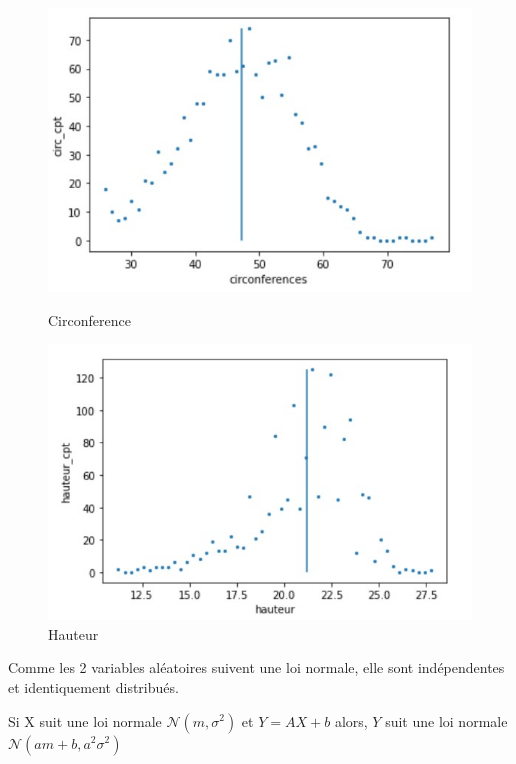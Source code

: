 \documentclass[pdflatex]{article}
\theoremstyle{definition}
\begin{document}
\begin{figure}
    \centering
    \begin{minipage}{0.45\textwidth}
        \centering
            \includegraphics[scale=0.5]{circ_normale.jpg}
            \caption{Circonference}
            \label{fig:Circonference}
    \end{minipage}\hfill
    \begin{minipage}{0.45\textwidth}
        \centering
        \includegraphics[scale=0.5]{hauteur_normale.jpg}
        \caption{Hauteur}
        \label{fig:Hauteur}
    \end{minipage}
\end{figure}


Comme les 2 variables al\'eatoires suivent une loi normale, elle sont ind\'ependentes et identiquement distribu\'es.

Si X suit une loi normale $\mathscr{N}(m, \sigma^2)$ et $Y = AX + b$ alors, $Y$ suit une loi normale $\mathscr{N}(am + b, a^2\sigma^2)$  
\end{document}
